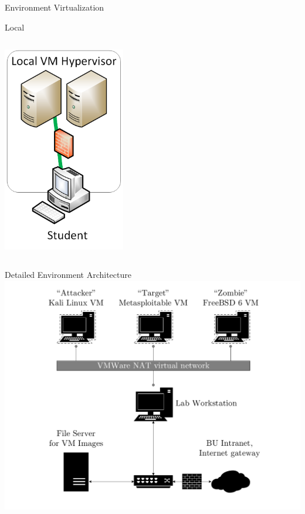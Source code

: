 \documentclass{beamer}
\begin{document}
\begin{frame}{Environment Virtualization}
\begin{block}{Local}
{\begin{columns}
            		\begin{column}{0.5\textwidth}
				\begin{center}
                 		\includegraphics[width=0.4\textwidth]{local-virt.png}
				\end{center}
              		\end{column}
            		\end{columns}		
			}	
		\end{block}		
	\end{frame}	

	\begin{frame}{Detailed Environment Architecture}
		\includegraphics[page=1,width=\textwidth]{../paper/ec521_hostmap.pdf}
	\end{frame}
\end{document}
